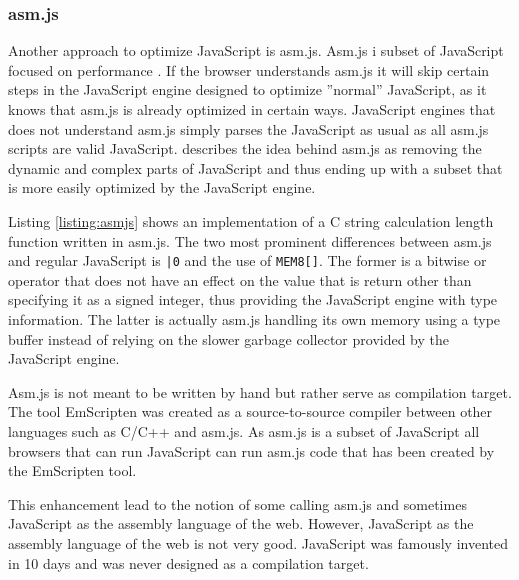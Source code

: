 
\subsubsection{asm.js}

Another approach to optimize JavaScript is asm.js. Asm.js i subset of JavaScript focused on performance \parencite{Zakai2018}. If the browser understands asm.js it will skip certain steps in the JavaScript engine designed to optimize ''normal'' JavaScript, as it knows that asm.js is already optimized in certain ways. JavaScript engines that does not understand asm.js simply parses the JavaScript as usual as all asm.js scripts are valid JavaScript. \textcite{Zakai2018} describes the idea behind asm.js as removing the dynamic and complex parts of JavaScript and thus ending up with a subset that is more easily optimized by the JavaScript engine.


%

Listing \ref{listing:asmjs} shows an implementation of a C string calculation length function written in asm.js. The two most prominent differences between asm.js and regular JavaScript is \texttt{|0} and the use of \texttt{MEM8[]}. The former is a bitwise or operator that does not have an effect on the value that is return other than specifying it as a signed integer, thus providing the JavaScript engine with type information. The latter is actually asm.js handling its own memory using a type buffer instead of relying on the slower garbage collector provided by the JavaScript engine.

Asm.js is not meant to be written by hand but rather serve as compilation target. The tool EmScripten \parencite{Zakai2011} was created as a source-to-source compiler between other languages such as C/C++ and asm.js. As asm.js is a subset of JavaScript all browsers that can run JavaScript can run asm.js code that has been created by the EmScripten tool.

This enhancement lead to the notion of some calling asm.js and sometimes JavaScript as the assembly language of the web. However, JavaScript as the assembly language of the web is not very good. JavaScript was famously invented in 10 days and was never designed as a compilation target.

